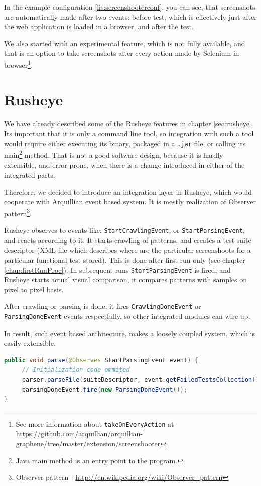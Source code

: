 \documentclass[11pt,oneside,final]{fithesis2}
\begin{document}
In the example configuration \ref{lis:screenshooterconf}, you can see, that screenshots are automatically 
made after two events: before test, which is effectively just after the web application is loaded in 
a browser, and after the test. 

We also started with an experimental feature, which is not fully available, and that is an option
to take screenshots after every action made by Selenium in browser\footnote{See more information 
about \texttt{takeOnEveryAction} at https://github.com/arquillian/arquillian-graphene/tree/master/extension/screenshooter}.
  
\section{Rusheye}
We have already described some of the Rusheye features in chapter \ref{sec:rusheye}. Its important that it
is only a command line tool, so integration with such a tool would require either executing its binary,
packaged in a \texttt{.jar} file, or calling its main\footnote{Java main method is an entry point
to the program.} method. That is not a good software design, because it is hardly extensible, and error prone,
when there is a change introduced in either of the integrated parts.

Therefore, we decided to introduce an integration layer in Rusheye, which would cooperate with Arquillian event based system.
It is mostly realization of Observer pattern\footnote{Observer pattern - \url{http://en.wikipedia.org/wiki/Observer_pattern}}.

Rusheye observes to events like: \texttt{StartCrawlingEvent}, or \texttt{StartParsingEvent}, and reacts according to it. It starts
crawling of patterns, and creates a test suite descriptor (XML file which describes where are the particular screenshoots for a particular
functional test stored). This is done after first run only (see chapter \ref{chap:firstRunProc}). In subsequent runs \texttt{StartParsingEvent}
is fired, and Rusheye starts actual visual comparison, it compares patterns with samples on pixel to pixel basis.

After crawling or parsing is done, it fires \texttt{CrawlingDoneEvent} or \texttt{ParsingDoneEvent} events respectfully, so other integrated
modules can wire up.

In result, such event based architecture, makes a loosely coupled system, which is easily extensible.

\begin{lstlisting}[caption=Example of StartParsingEvent observer,label=lis:startParsingObserver,language=java]
public void parse(@Observes StartParsingEvent event) {
     // Initialization code ommited
     parser.parseFile(suiteDescriptor, event.getFailedTestsCollection());
     parsingDoneEvent.fire(new ParsingDoneEvent());
}
\end{lstlisting}
  
\end{document}

